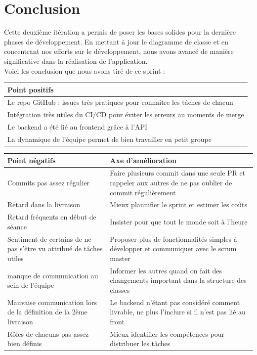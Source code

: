 \documentclass[a4paper]{article}
\begin{document}
\section*{Conclusion}
Cette deuxième itération a permis de poser les bases solides pour la dernière phases de développement. En mettant à jour le diagramme de classe et en concentrant nos efforts sur le développement, nous avons avancé de manière significative dans la réalisation de l’application. \\
\newline
Voici les conclusion que nous avons tiré de ce sprint :
    \begin{table}[H]
    \centering
    \begin{tabularx}{\textwidth}{|X|}
    \hline
    \textbf{Point positifs} \\ \hline
    Le repo GitHub : issues très pratiques pour connaitre les tâches de chacun \\ \hline
    Intégration très utiles du CI/CD pour éviter les erreurs au moments de merge\\ \hline
    Le backend a été lié au frontend grâce à l'API \\ \hline
    La dynamique de l'équipe permet de bien travailler en petit groupe \\ \hline
    \end{tabularx}
    \end{table}

    \begin{table}[H]
    \centering
    \begin{tabularx}{\textwidth}{|X|X|}
    \hline
    \textbf{Point négatifs} & \textbf{Axe d'amélioration} \\ \hline
    Commits pas assez régulier & Faire plusieurs commit dans une seule PR et rappeler aux autres de ne pas oublier de commit régulièrement \\ \hline
    Retard dans la livraison & Mieux plannifier le sprint et estimer les coûts \\ \hline
    Retard fréquents en début de séance & Insister pour que tout le monde soit à l'heure \\ \hline
    Sentiment de certains de ne pas s'être vu attribué de tâches utiles & Proposer plus de fonctionnalités simples à développer et communiquer avec le scrum master \\ \hline
    manque de communication au sein de l'équipe & Informer les autres quand on fait des changements important dans la structure des classes \\ \hline
    Mauvaise communication lors de la définition de la 2ème livraison & Le backend n'étant pas considéré comment livrable, ne plus l'inclure si il n'est pas lié au front \\ \hline
    Rôles de chacuns pas assez bien définis & Mieux identifier les compétences pour distribuer les tâches \\ \hline
    \end{tabularx}
    \end{table}
\end{document}
